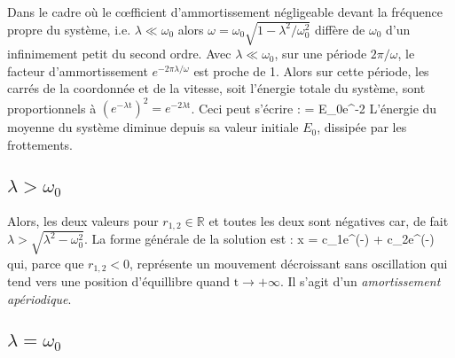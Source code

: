 Dans le cadre o\`{u} le c{\oe}fficient d'ammortissement n\'{e}gligeable devant la fr\'{e}quence propre du syst\`{e}me, i.e. $\lambda \ll \omega_{0}$ alors $\omega = \omega_{0}\sqrt{1 - \lambda^{2}/\omega_{0}^{2}}$ diff\`{e}re de $\omega_{0}$ d'un infinimement petit du second ordre. Avec $\lambda \ll \omega_{0}$, sur une p\'{e}riode $2\pi/\omega$, le facteur d'ammortissement $e^{-2\pi\lambda/\omega}$ est proche de 1. Alors sur cette p\'{e}riode, les carr\'{e}s de la coordonn\'{e}e et de la vitesse, soit l'\'{e}nergie totale du syst\`{e}me, sont proportionnels \`{a} $(e^{-\lambda\mathrm{t}})^{2} = e^{-2\lambda\mathrm{t}}$. Ceci peut s'\'{e}crire :
\be
	 = E_{0}e^{-2\lambda{}} \label{EQ:25_5}
\ee
L'\'{e}nergie du moyenne du syst\`{e}me diminue depuis sa valeur initiale $E_{0}$, dissip\'{e}e par les frottements.

\subsection{$\lambda > \omega_{0}$}

Alors, les deux valeurs pour $r_{1,2} \in \mathbb{R}$ et toutes les deux sont n\'{e}gatives car, de fait $\lambda > \sqrt{\lambda^{2} - \omega_{0}^{2}}$. La forme g\'{e}n\'{e}rale de la solution est :
\be
	x = c_{1}e^{\left(-\lambda \pm {}\right)} + c_{2}e^{\left(-\lambda \pm {}\right)} \label{EQ:25_6}
\ee
qui, parce que $r_{1,2} < 0$, repr\'{e}sente un mouvement d\'{e}croissant sans oscillation qui tend vers une position d'\'{e}quillibre quand $\mathrm{t} \rightarrow +\infty$. Il s'agit d'un \emph{amortissement ap\'{e}riodique}.

\subsection{$\lambda = \omega_{0}$}

